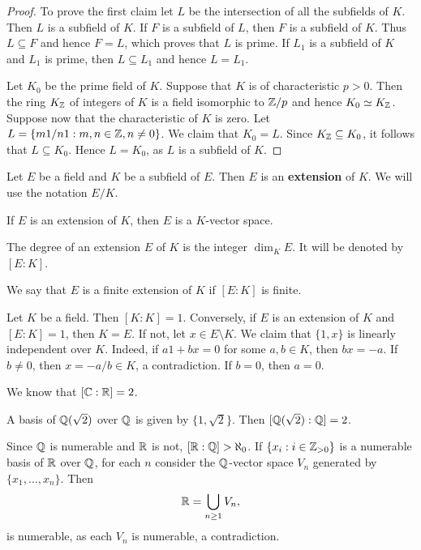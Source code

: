 \begin{proof}
	To prove the first claim let $L$ be the intersection
	of all the subfields of $K$. Then $L$ is a subfield of $K$. 
	If $F$ is a subfield of $L$, then $F$ is a subfield
	of $K$. Thus $L\subseteq F$ and hence $F=L$, which proves
	that $L$ is prime. If $L_1$ is a subfield of $K$
	and $L_1$ is prime, then $L\subseteq L_1$ and 
	hence $L=L_1$. 

	Let $K_0$ be the prime field of $K$.  Suppose that $K$ is of characteristic
	$p>0$. Then the ring $K_{\mathbb{Z}}$ of integers of $K$ 
	is a field isomorphic to $\mathbb{Z}/p$ and hence $K_0\simeq
	K_{\mathbb{Z}}$. Suppose now that the characteristic of $K$ is zero. Let
	$L=\{m1/n1:m,n\in\mathbb{Z},n\ne 0\}$. We claim that $K_0=L$. Since $K_{\mathbb{Z}}\subseteq
	K_0$, it follows that $L\subseteq K_0$. Hence $L=K_0$, as $L$ is a subfield
	of $K$.  
\end{proof}

\begin{definition}
	Let $E$ be a field and $K$ be a subfield of $E$. Then 
	$E$ is an \textbf{extension} of $K$. We will use
	the notation $E/K$. 
\end{definition}

If $E$ is an extension of $K$, then $E$ is a
$K$-vector space. 

\begin{definition}
	The degree of an extension $E$ of $K$ 
	is the integer $\dim_KE$. It will be denoted by $[E:K]$. 
\end{definition}

We say that $E$ is a finite extension of $K$ 
if $[E:K]$ is finite. 

\begin{example}
	Let $K$ be a field. Then $[K:K]=1$. Conversely, 
	if $E$ is an extension of $K$ and $[E:K]=1$, then $K=E$. 
	If not, let $x\in E\setminus K$. We claim that
	$\{1,x\}$ is linearly independent over $K$. Indeed, 
	if $a1+bx=0$ for some $a,b\in K$, then $bx=-a$. If 
	$b\ne 0$, then $x=-a/b\in K$, a contradiction. If $b=0$, then 
	$a=0$. 
\end{example}

We know that $[\mathbb{C}:\mathbb{R}]=2$. 

\begin{example}
	A basis of $\mathbb{Q}(\sqrt{2})$ over $\mathbb{Q}$ 
	is given by $\{1,\sqrt{2}\}$. Then 
	$[\mathbb{Q}(\sqrt{2}):\mathbb{Q}]=2$. 
\end{example}

\begin{example}
	Since $\mathbb{Q}$ is numerable and 
	$\mathbb{R}$ is not, $[\mathbb{R}:\mathbb{Q}]>\aleph_0$. If $\{x_i:i\in\mathbb{Z}_{>0}\}$ 
	is a numerable basis of $\mathbb{R}$ over $\mathbb{Q}$, for each
	$n$ consider the $\mathbb{Q}$-vector space
	$V_n$ generated by $\{x_1,\dots,x_n\}$. Then 
	\[
		\mathbb{R}=\bigcup_{n\geq1}V_n,
	\]
	is numerable, as each $V_n$ is numerable, a contradiction.
\end{example}

